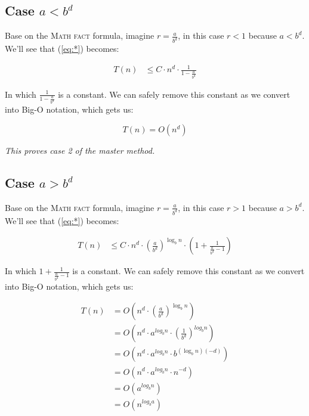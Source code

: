 \documentclass{article}
\begin{document}
\subsection*{Case $a < b^d$}

Base on the \textsc{Math fact} formula, imagine $r = \frac{a}{b^d}$, in this case $r < 1$ because $a < b^d$. We'll see that (\ref{eq:*}) becomes:

\begin{equation*}
\begin{split}
T(n) & \leq C \cdot n^d \cdot \frac{1}{1 - \frac{a}{b^d}}
\end{split}
\end{equation*}

\noindent In which $\frac{1}{1 - \frac{a}{b^d}}$ is a constant. We can safely remove this constant as we convert into Big-O notation, which gets us:

\begin{equation*}
T(n) = O(n^d)
\end{equation*}

\noindent \textit{This proves case 2 of the master method.}

\subsection*{Case $a > b^d$}

Base on the \textsc{Math fact} formula, imagine $r = \frac{a}{b^d}$, in this case $r > 1$ because $a > b^d$. We'll see that (\ref{eq:*}) becomes:

\begin{equation*}
\begin{split}
T(n) & \leq C \cdot n^d \cdot (\frac{a}{b^d})^{\log_{b} n} \cdot (1 + \frac{1}{\frac{a}{b^d} - 1})
\end{split}
\end{equation*}

\noindent In which $1 + \frac{1}{\frac{a}{b^d} - 1}$ is a constant. We can safely remove this constant as we convert into Big-O notation, which gets us:

\begin{equation*}
\begin{split}
T(n) & = O(n^d \cdot (\frac{a}{b^d})^{\log_{b} n}) \\
     & = O(n^d \cdot a^{log_{b} n} \cdot (\frac{1}{b^d})^{log_{b} n}) \\
     & = O(n^d \cdot a^{log_{b} n} \cdot b^{(\log_{b} n)(-d)}) \\
     & = O(n^d \cdot a^{log_{b} n} \cdot n^{-d}) \\
     & = O(a^{log_{b} n}) \\
     & = O(n^{log_{b} a})
\end{split}
\end{equation*}
\end{document}
